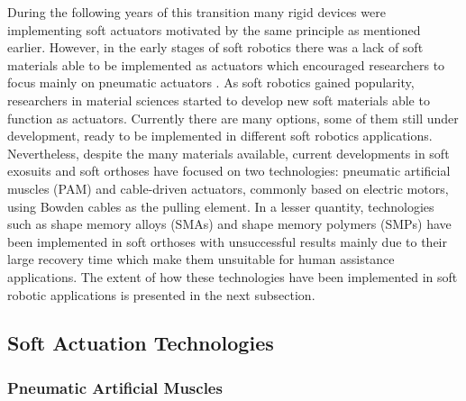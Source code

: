 During the following years of this transition many rigid devices were implementing soft actuators motivated by the same principle as mentioned earlier. However, in the early stages of soft robotics there was a lack of soft materials able to be implemented as actuators which encouraged researchers to focus mainly on pneumatic actuators \cite{Belforte2014}. As soft robotics gained popularity, researchers in material sciences started to develop new soft materials able to function as actuators. Currently there are many options, some of them still under development, ready to be implemented in different soft robotics applications. Nevertheless, despite the many materials available, current developments in soft exosuits and soft orthoses have focused on two technologies: pneumatic artificial muscles (PAM) and cable-driven actuators, commonly based on electric motors, using Bowden cables as the pulling element. In a lesser quantity, technologies such as shape memory alloys (SMAs) and shape memory polymers (SMPs) have been implemented in soft orthoses with unsuccessful results mainly due to their large recovery time which make them unsuitable for human assistance applications. The extent of how these technologies have been implemented in soft robotic applications is presented in the next subsection.

\subsection{Soft Actuation Technologies}

\subsubsection{Pneumatic Artificial Muscles} \label{sec:PMAs}

